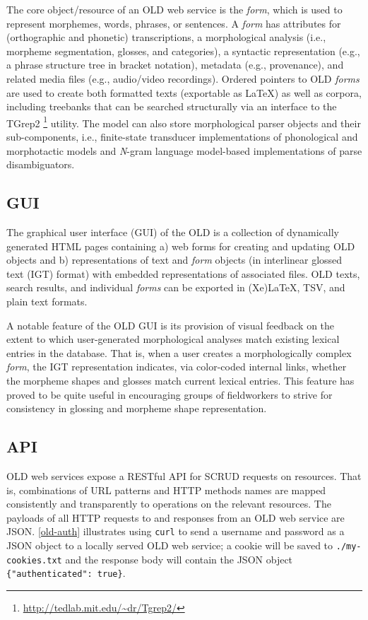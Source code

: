 \documentclass[11pt]{article}
\begin{document}
The core object/resource of an OLD web service is the \textit{form}, which is
used to represent morphemes, words, phrases, or sentences. A \emph{form} has
attributes for (orthographic and phonetic) transcriptions, a morphological
analysis (i.e., morpheme segmentation, glosses, and categories), a syntactic
representation (e.g., a phrase structure tree in bracket notation), metadata
(e.g., provenance), and related media files (e.g., audio/video recordings).
Ordered pointers to OLD \emph{forms} are used to create both formatted texts
(exportable as LaTeX) as well as corpora, including treebanks that can be
searched structurally via an interface to the TGrep2%
\footnote{\url{http://tedlab.mit.edu/~dr/Tgrep2/}} %
utility. The model can also store morphological parser objects and their
sub-components, i.e., finite-state transducer implementations of phonological
and morphotactic models and \textit{N}-gram language model-based implementations
of parse disambiguators.


\subsection{GUI}

The graphical user interface (GUI) of the OLD %
is a collection of dynamically generated HTML pages containing a) web forms for
creating and updating OLD objects and b) representations of text and
\emph{form} objects (in interlinear glossed text (IGT) format) with embedded
representations of associated files. OLD texts, search results, and individual
\emph{forms} can be exported in (Xe)LaTeX, TSV, and plain text formats.

A notable feature of the OLD GUI is its provision of visual feedback on the
extent to which user-generated morphological analyses match existing lexical
entries in the database. That is, when a user creates a morphologically complex
\emph{form}, the IGT representation indicates, via color-coded internal links,
whether the morpheme shapes and glosses match current lexical entries. This
feature has proved to be quite useful in encouraging groups of fieldworkers to
strive for consistency in glossing and morpheme shape representation.


\subsection{API}

OLD web services expose a RESTful API for SCRUD requests on resources. That is,
combinations of URL patterns and HTTP methods names are mapped consistently and
transparently to operations on the relevant resources. The payloads of all HTTP
requests to and responses from an OLD web service are JSON. \autoref{old-auth}
illustrates using \texttt{curl} to send a username and password as a JSON object
to a locally served OLD web service; a cookie will be saved to \texttt{./my-cookies.txt} and
the response body will contain the JSON object \texttt{\{"authenticated":
true\}}.
\end{document}
